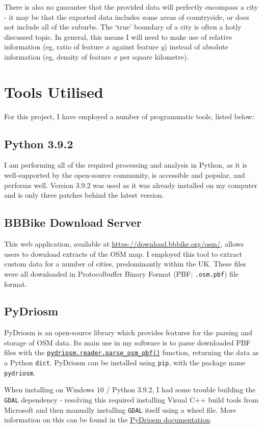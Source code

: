 \documentclass[12pt]{article} %
\begin{document}
There is also no guarantee that the provided data will perfectly encompass a city - it may be that the exported data includes some areas of countryside, or does not include all of the suburbs. The `true' boundary of a city is often a hotly discussed topic. In general, this means I will need to make use of relative information (eg, ratio of feature $x$ against feature $y$) instead of absolute information (eg, density of feature $x$ per square kilometre).


\section{Tools Utilised}
For this project, I have employed a number of programmatic tools, listed below:

\subsection{Python 3.9.2}
I am performing all of the required processing and analysis in Python, as it is well-supported by the open-source community, is accessible and popular, and performs well. Version 3.9.2 was used as it was already installed on my computer and is only three patches behind the latest version.

\subsection{BBBike Download Server}
This web application, available at \href{https://download.bbbike.org/osm/}{https://download.bbbike.org/osm/}, allows users to download extracts of the OSM map. I employed this tool to extract custom data for a number of cities, predominantly within the UK. These files were all downloaded in Protocolbuffer Binary Format (PBF; \texttt{.osm.pbf}) file format.

\subsection{PyDriosm}
PyDriosm is an open-source library which provides features for the parsing and storage of OSM data. Its main use in my software is to parse downloaded PBF files with the \href{https://pydriosm.readthedocs.io/en/latest/_generated/pydriosm.reader.parse_osm_pbf.html}{\texttt{pydriosm.reader.parse\_osm\_pbf()}} function, returning the data as a Python \texttt{dict}. PyDriosm can be installed using \texttt{pip}, with the package name \texttt{pydriosm}.

When installing on Windows 10 / Python 3.9.2, I had some trouble building the \texttt{GDAL} dependency - resolving this required installing Visual C++ build tools from Microsoft and then manually installing \texttt{GDAL} itself using a wheel file. More information on this can be found in the \href{https://pydriosm.readthedocs.io/en/latest/installation.html}{PyDriosm documentation}.
\end{document}
